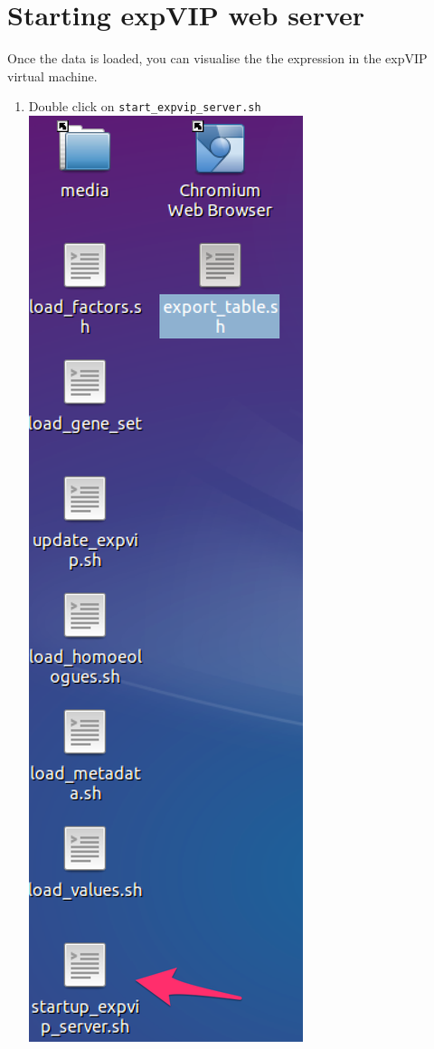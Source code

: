 \section{Starting expVIP web server}\label{starting-expvip-web-server}

Once the data is loaded, you can visualise the the expression in the
expVIP virtual machine.

\begin{enumerate}
\def\labelenumi{\arabic{enumi}.}
\itemsep1pt\parskip0pt
\item
  Double click on \lstinline!start_expvip_server.sh!
  \includegraphics{images/StartupServer01.png}

\end{enumerate}
